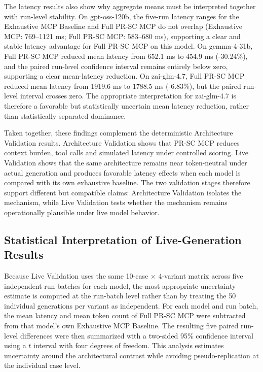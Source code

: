 The latency results also show why aggregate means must be interpreted together with run-level stability. On gpt-oss-120b, the five-run latency ranges for the Exhaustive MCP Baseline and Full PR-SC MCP do not overlap (Exhaustive MCP: 769--1121 ms; Full PR-SC MCP: 583--680 ms), supporting a clear and stable latency advantage for Full PR-SC MCP on this model. On gemma-4-31b, Full PR-SC MCP reduced mean latency from 652.1 ms to 454.9 ms (-30.24\%), and the paired run-level confidence interval remains entirely below zero, supporting a clear mean-latency reduction. On zai-glm-4.7, Full PR-SC MCP reduced mean latency from 1919.6 ms to 1788.5 ms (-6.83\%), but the paired run-level interval crosses zero. The appropriate interpretation for zai-glm-4.7 is therefore a favorable but statistically uncertain mean latency reduction, rather than statistically separated dominance.

Taken together, these findings complement the deterministic Architecture Validation results. Architecture Validation shows that PR-SC MCP reduces context burden, tool calls and simulated latency under controlled scoring. Live Validation shows that the same architecture remains near token-neutral under actual generation and produces favorable latency effects when each model is compared with its own exhaustive baseline. The two validation stages therefore support different but compatible claims: Architecture Validation isolates the mechanism, while Live Validation tests whether the mechanism remains operationally plausible under live model behavior.

\FloatBarrier
\subsection{Statistical Interpretation of Live-Generation Results}

Because Live Validation uses the same 10-case $\times$ 4-variant matrix across five independent run batches for each model, the most appropriate uncertainty estimate is computed at the run-batch level rather than by treating the 50 individual generations per variant as independent. For each model and run batch, the mean latency and mean token count of Full PR-SC MCP were subtracted from that model's own Exhaustive MCP Baseline. The resulting five paired run-level differences were then summarized with a two-sided 95\% confidence interval using a $t$ interval with four degrees of freedom. This analysis estimates uncertainty around the architectural contrast while avoiding pseudo-replication at the individual case level.


